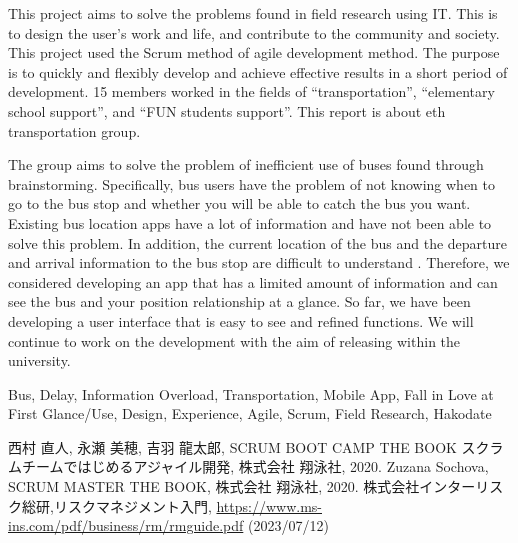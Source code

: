 \documentclass[openany,11pt,papersize,dvipdfm,draft]{jsbook}
\begin{document}
\begin{eabstract}
    This project aims to solve the problems found in field research using IT.
    This is to design the user's work and life, and contribute to the community and society.
    This project used the Scrum method of agile development method.
    The purpose is to quickly and flexibly develop and achieve effective results in a short period of development.
    15 members worked in the fields of ``transportation'', ``elementary school support'', and ``FUN students support''.
    This report is about eth transportation group.

    The group aims to solve the problem of inefficient use of buses found through brainstorming.
    Specifically, bus users have the problem of not knowing when to go to the bus stop and whether you will be able to catch the bus you want.
    Existing bus location apps have a lot of information and have not been able to solve this problem.
    In addition, the current location of the bus and the departure and arrival information to the bus stop are difficult to understand .
    Therefore, we considered developing an app that has a limited amount of information and can see the bus and your position relationship at a glance.
    So far, we have been developing a user interface that is easy to see and refined functions.
    We will continue to work on the development with the aim of releasing within the university.

\begin{ekeyword}
Bus, Delay, Information Overload, Transportation, Mobile App, Fall in Love at First Glance/Use, Design, Experience, Agile, Scrum, Field Research, Hakodate
\end{ekeyword}
\end{eabstract}

\tableofcontents

\mainmatter








\begin{appendix}


\end{appendix}

\begin{thebibliography}{3}
     西村 直人, 永瀬 美穂, 吉羽 龍太郎, SCRUM BOOT CAMP THE BOOK スクラムチームではじめるアジャイル開発, 株式会社 翔泳社, 2020.
     Zuzana Sochova, SCRUM MASTER THE BOOK, 株式会社 翔泳社, 2020.
     株式会社インターリスク総研,リスクマネジメント入門, \url{https://www.ms-ins.com/pdf/business/rm/rmguide.pdf} (2023/07/12)
\end{thebibliography}
\end{document}
